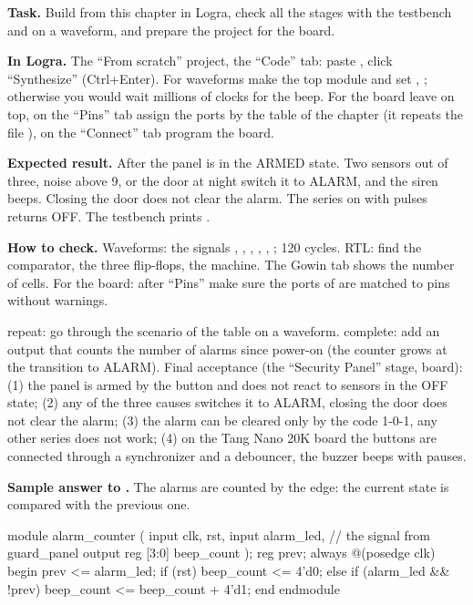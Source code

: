 \begin{diybox}
\textbf{Task.} Build  from this chapter in Logra, check all the stages with the testbench and on a waveform, and prepare the project for the board.

\textbf{In Logra.} The ``From scratch'' project, the ``Code'' tab: paste , click ``Synthesize'' (Ctrl+Enter). For waveforms make  the top module and set , ; otherwise you would wait millions of clocks for the beep. For the board leave  on top, on the ``Pins'' tab assign the ports by the table of the chapter (it repeats the file ), on the ``Connect'' tab program the board.

\textbf{Expected result.} After  the panel is in the ARMED state. Two sensors out of three, noise above 9, or the door at night switch it to ALARM, and the siren beeps. Closing the door does not clear the alarm. The series  on  with  pulses returns OFF. The testbench prints .

\textbf{How to check.} Waveforms: the signals , , , , , ; 120 cycles. RTL: find the comparator, the three  flip-flops, the machine. The Gowin tab shows the number of cells. For the board: after ``Pins'' make sure the ports of  are matched to pins without warnings.

 repeat: go through the scenario of the table on a waveform.  complete: add an output  that counts the number of alarms since power-on (the counter grows at the transition to ALARM).  Final acceptance (the ``Security Panel'' stage, board): (1) the panel is armed by the button and does not react to sensors in the OFF state; (2) any of the three causes switches it to ALARM, closing the door does not clear the alarm; (3) the alarm can be cleared only by the code 1-0-1, any other series does not work; (4) on the Tang Nano 20K board the buttons are connected through a synchronizer and a debouncer, the buzzer beeps with pauses.
\end{diybox}

\textbf{Sample answer to .} The alarms are counted by the edge: the current state is compared with the previous one.
\begin{vcode}
module alarm_counter (
    input        clk, rst,
    input        alarm_led,        // the signal from guard_panel
    output reg [3:0] beep_count
);
    reg prev;
    always @(posedge clk) begin
        prev <= alarm_led;
        if (rst) beep_count <= 4'd0;
        else if (alarm_led && !prev) beep_count <= beep_count + 4'd1;
    end
endmodule
\end{vcode}


